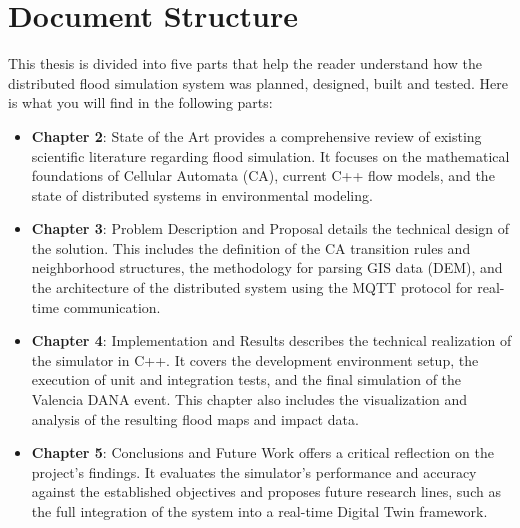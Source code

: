 

\section{Document Structure}

This thesis is divided into five parts that help the reader understand how the distributed flood simulation system was planned, 
designed, built and tested. Here is what you will find in the following parts:

\begin{itemize}
\item \textbf{Chapter 2}: State of the Art provides a comprehensive review of existing scientific literature regarding flood simulation. It focuses on the mathematical foundations of Cellular Automata (CA), current C++ flow models, and the state of distributed systems in environmental modeling.
\item \textbf{Chapter 3}: Problem Description and Proposal details the technical design of the solution. This includes the definition of the CA transition rules and neighborhood structures, the methodology for parsing GIS data (DEM), and the architecture of the distributed system using the MQTT protocol for real-time communication.
\item \textbf{Chapter 4}: Implementation and Results describes the technical realization of the simulator in C++. It covers the development environment setup, the execution of unit and integration tests, and the final simulation of the Valencia DANA event. This chapter also includes the visualization and analysis of the resulting flood maps and impact data.
\item \textbf{Chapter 5}: Conclusions and Future Work offers a critical reflection on the project’s findings. It evaluates the simulator's performance and accuracy against the established objectives and proposes future research lines, such as the full integration of the system into a real-time Digital Twin framework.
\end{itemize}
